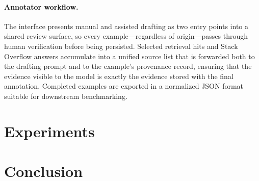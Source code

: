 \documentclass[11pt]{article}
\begin{document}
\paragraph{Annotator workflow.} The interface presents manual and assisted drafting as two entry points into a shared review surface, so every example---regardless of origin---passes through human verification before being persisted. Selected retrieval hits and Stack Overflow answers accumulate into a unified source list that is forwarded both to the drafting prompt and to the example's provenance record, ensuring that the evidence visible to the model is exactly the evidence stored with the final annotation. Completed examples are exported in a normalized JSON format suitable for downstream benchmarking.

\section{Experiments}\label{sec4}
\section{Conclusion}\label{sec5}





\end{document}

